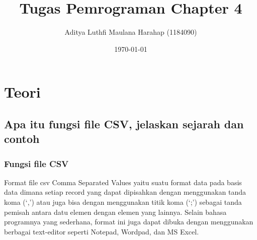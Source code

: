 \documentclass[12pt, times new roman]{report}
\title{Tugas Pemrograman Chapter 4}
\author{Aditya Luthfi Maulana Harahap (1184090)}
\date{\today}
\begin{document}
\maketitle

\chapter{Teori}

\section{Apa itu fungsi file CSV, jelaskan sejarah dan contoh}

\subsection{Fungsi file CSV}
\hspace{1cm}Format file csv Comma Separated Values yaitu suatu format data pada basis data dimana setiap record yang dapat dipisahkan dengan menggunakan tanda koma (‘,’) atau juga bisa dengan menggunakan titik koma (‘;’) sebagai tanda pemisah antara datu elemen dengan elemen yang lainnya. Selain bahasa programnya yang sederhana, format ini juga dapat dibuka dengan menggunakan berbagai text-editor seperti Notepad, Wordpad, dan MS Excel.
\end{document}
